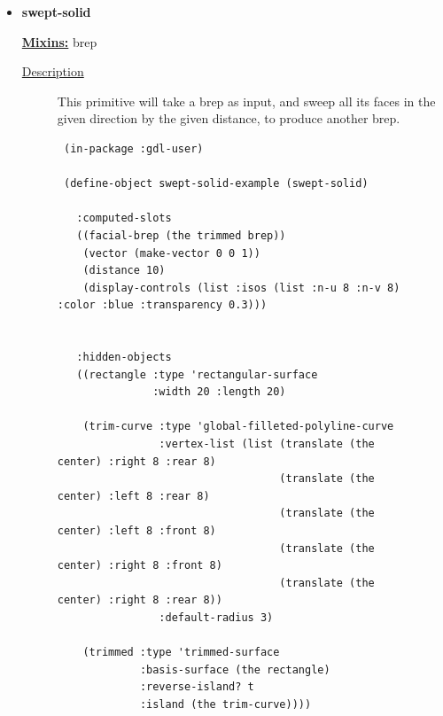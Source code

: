 \documentclass [11pt]{book}
\begin{document}
\begin{itemize}
\begin{description}
.




\end{description}







\item {}
\label{prim:swept-solid}
\textbf{swept-solid}


\textbf{
\underline{Mixins:}} brep





\begin{description}

\item [
\underline{Description}]


This primitive will take a brep as input,
and sweep all its faces in the given direction by the given distance,
to produce another brep.



\end{description}




\begin{figure}
\begin{lrbox}{\boxedverb}
\begin{minipage}{\linewidth}
{\small

\begin{verbatim}
 (in-package :gdl-user)

 (define-object swept-solid-example (swept-solid)

   :computed-slots
   ((facial-brep (the trimmed brep))
    (vector (make-vector 0 0 1))
    (distance 10)
    (display-controls (list :isos (list :n-u 8 :n-v 8) :color :blue :transparency 0.3)))

  
   :hidden-objects
   ((rectangle :type 'rectangular-surface
               :width 20 :length 20)

    (trim-curve :type 'global-filleted-polyline-curve
                :vertex-list (list (translate (the center) :right 8 :rear 8)
                                   (translate (the center) :left 8 :rear 8)
                                   (translate (the center) :left 8 :front 8)
                                   (translate (the center) :right 8 :front 8)
                                   (translate (the center) :right 8 :rear 8))
                :default-radius 3)

    (trimmed :type 'trimmed-surface
             :basis-surface (the rectangle)
             :reverse-island? t
             :island (the trim-curve))))


\end{verbatim}}
\end{minipage}
\end{lrbox}
\end{figure}
\end{itemize}
\end{document}
